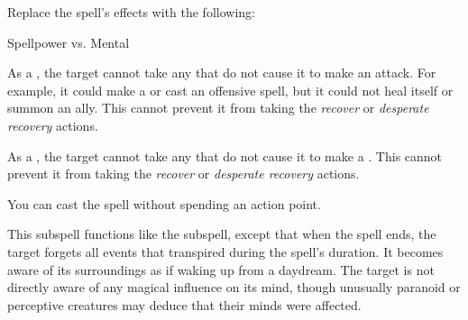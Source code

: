 Replace the spell's effects with the following:
\begin{spellcontent}

\begin{augmenteffects}




\begin{spellattack}{Spellpower vs. Mental}


\spellsuccess
As a , the target cannot take any  that do not cause it to make an attack.
For example, it could make a  or cast an offensive spell, but it could not heal itself or summon an ally.
This cannot prevent it from taking the \textit{recover} or \textit{desperate recovery} actions.



\spellcritical
As a , the target cannot take any  that do not cause it to make a .
This cannot prevent it from taking the \textit{recover} or \textit{desperate recovery} actions.



\end{spellattack}





\end{augmenteffects}

\end{spellcontent}





You can cast the spell without spending an action point.






This subspell functions like the  subspell, except that when the spell ends, the target forgets all events that transpired during the spell's duration.
It becomes aware of its surroundings as if waking up from a daydream.
The target is not directly aware of any magical influence on its mind, though unusually paranoid or perceptive creatures may deduce that their minds were affected.





